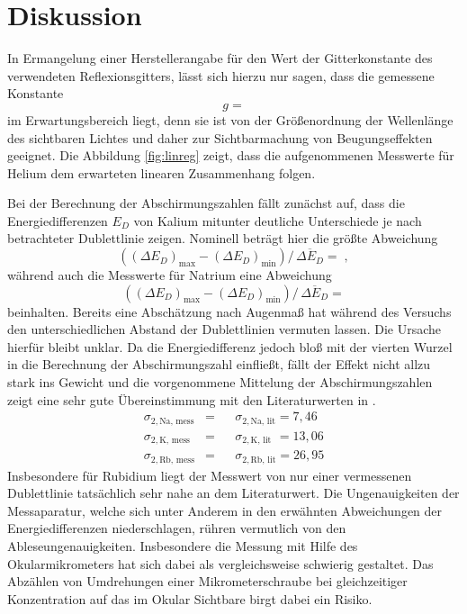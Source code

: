 \section{Diskussion}
\label{sec:Diskussion}
In Ermangelung einer Herstellerangabe für den Wert der Gitterkonstante des verwendeten Reflexionsgitters, lässt sich hierzu nur sagen, dass die gemessene Konstante
\begin{equation*}
  g = 
\end{equation*}
im Erwartungsbereich liegt, denn sie ist von der Größenordnung der Wellenlänge des sichtbaren Lichtes und daher zur Sichtbarmachung von Beugungseffekten geeignet. Die Abbildung \ref{fig:linreg} zeigt, dass die aufgenommenen Messwerte für Helium dem erwarteten linearen Zusammenhang folgen.

Bei der Berechnung der Abschirmungszahlen fällt zunächst auf, dass die Energiedifferenzen $E_D$ von Kalium mitunter deutliche Unterschiede je nach betrachteter Dublettlinie zeigen. Nominell beträgt hier die größte Abweichung
\begin{equation*}
  ((\Delta E_D)_\text{max} - (\Delta E_D)_\text{min} ) / \,\overline{\Delta E_D}  =  \; ,
\end{equation*}
während auch die Messwerte für Natrium eine Abweichung
\begin{equation*}
  ((\Delta E_D)_\text{max} - (\Delta E_D)_\text{min} ) / \,\overline{\Delta E_D}  = 
\end{equation*}
beinhalten. Bereits eine Abschätzung nach Augenmaß hat während des Versuchs den unterschiedlichen Abstand der Dublettlinien vermuten lassen. Die Ursache hierfür bleibt unklar. Da die Energiedifferenz jedoch bloß mit der vierten Wurzel in die Berechnung der Abschirmungszahl einfließt, fällt der Effekt nicht allzu stark ins Gewicht und die vorgenommene Mittelung der Abschirmungszahlen zeigt eine sehr gute Übereinstimmung mit den Literaturwerten in \cite{lit1}.
\begin{align*}
  \sigma_{2, \text{Na, mess}} &=   & & \sigma_{2, \text{Na, lit}} = 7,46   \\
  \sigma_{2, \text{K, mess}} &=   & & \sigma_{2, \text{K, lit}} \,\,= 13,06     \\
  \sigma_{2, \text{Rb, mess}} &=   & & \sigma_{2, \text{Rb, lit}} = 26,95
\end{align*}
Insbesondere für Rubidium liegt der Messwert von nur einer vermessenen Dublettlinie tatsächlich sehr nahe an dem Literaturwert. Die Ungenauigkeiten der Messaparatur, welche sich unter Anderem in den erwähnten Abweichungen der Energiedifferenzen niederschlagen, rühren vermutlich von den Ableseungenauigkeiten. Insbesondere die Messung mit Hilfe des Okularmikrometers hat sich dabei als vergleichsweise schwierig gestaltet. Das Abzählen von Umdrehungen einer Mikrometerschraube bei gleichzeitiger Konzentration auf das im Okular Sichtbare birgt dabei ein Risiko.
